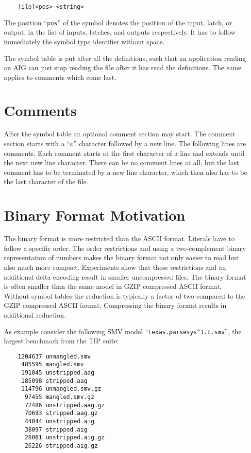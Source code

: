 \documentclass[10pt]{llncs}
\begin{document}
\begin{verbatim}
    [ilo]<pos> <string>
\end{verbatim}
  
  The position ``\texttt{pos}'' of the symbol denotes the position of the input, latch,
  or output, in the list of inputs, latches, and outputs respectively.  It
  has to follow immediately the symbol type identifier without space.

  The symbol table is put after all the definitions, such that an
  application reading an AIG can just stop reading the file after it has
  read the definitions.  The same applies to comments which come last.

\section{Comments}
 
  After the symbol table an optional comment section may start.  The comment
  section starts with a ``\texttt{c}'' character followed by a new line.  The following
  lines are comments.  Each comment starts at the first character of a line
  and extends until the next new line character.  There can be no comment
  lines at all, but the last comment has to be terminated by a new line
  character, which then also has to be the last character of the file.

\section{Binary Format Motivation}

  The binary format is more restricted than the ASCII format.  Literals have
  to follow a specific order.  The order restrictions and using a
  two-complement binary representation of numbers makes the binary format
  not only easier to read but also much more compact.  Experiments show that
  these restrictions and an additional delta encoding result in smaller
  uncompressed files.  The binary format is often smaller than the same
  model in GZIP compressed ASCII format.  Without symbol tables the
  reduction is typically a factor of two compared to the GZIP compressed
  ASCII format.  Compressing the binary format results in additional
  reduction.  
  
  As example consider the following SMV model ``\texttt{texas.parsesys\^\relax 1.E.smv}'', the
  largest benchmark from the TIP suite:  

\begin{verbatim}
    1204637 unmangled.smv
     485595 mangled.smv
     191045 unstripped.aag
     185098 stripped.aag
     114796 unmangled.smv.gz
      97455 mangled.smv.gz
      72486 unstripped.aag.gz
      70693 stripped.aag.gz
      44044 unstripped.aig
      38097 stripped.aig
      28061 unstripped.aig.gz
      26226 stripped.aig.gz
\end{verbatim}
\end{document}

